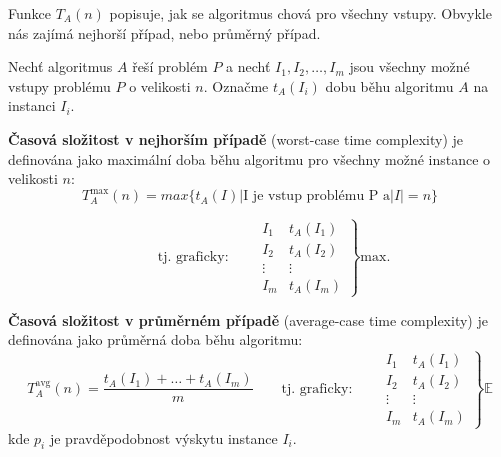 \documentclass[openany,12pt,a4paper]{book}
\begin{document}
Funkce $T_A(n)$ popisuje, jak se algoritmus chová pro všechny vstupy.
Obvykle nás zajímá nejhorší případ, nebo průměrný případ.


Nechť algoritmus $A$ řeší problém $P$ a nechť $I_1, I_2, \dots, I_m$ jsou všechny možné vstupy problému $P$ o velikosti $n$.  
Označme $t_A(I_i)$ dobu běhu algoritmu $A$ na instanci $I_i$.

\begin{definition}
\textbf{Časová složitost v nejhorším případě} (worst-case time complexity) je definována jako maximální doba běhu algoritmu pro všechny možné instance o velikosti $n$:
\[
T_A^{\max}(n) = max\{t_A(I)|\text{I je vstup problému P a} |I| = n\}
\]

\[
\qquad \text{tj. graficky:} \qquad
\left.
\begin{array}{c|c}
I_1 & t_A(I_1) \\
I_2 & t_A(I_2) \\
\vdots & \vdots \\
I_m & t_A(I_m)
\end{array}
\right\}
\text{max.}
\]
\end{definition}
\newpage
\begin{definition}
\textbf{Časová složitost v průměrném případě} (average-case time complexity) je definována jako průměrná doba běhu algoritmu:
\[
T_A^{\text{avg}}(n) = \frac{t_A(I_1) + \dots + t_A(I_m)}{m}
\qquad \text{tj. graficky:} \qquad
\left.
\begin{array}{c|c}
I_1 & t_A(I_1) \\
I_2 & t_A(I_2) \\
\vdots & \vdots \\
I_m & t_A(I_m)
\end{array}
\right\}
\mathbb{E}
\]
kde $p_i$ je pravděpodobnost výskytu instance $I_i$.
\end{definition}
\end{document}
